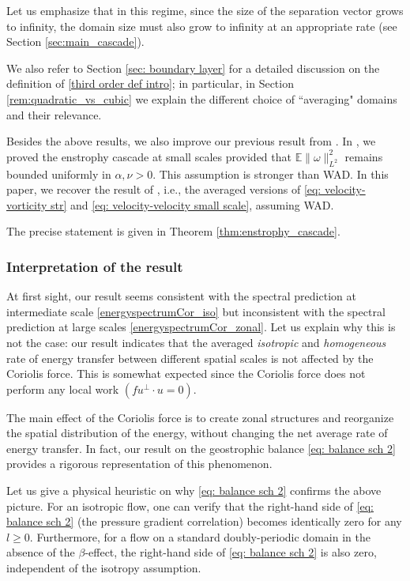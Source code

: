 \documentclass[11pt,a4paper]{article}
\numberwithin{equation}{section}
\numberwithin{theorem}{section}
\numberwithin{remark}{section}
\numberwithin{definition}{section}
\begin{document}
Let us emphasize that in this regime, since the size of the separation vector grows to infinity, the domain size must also grow to infinity at an appropriate rate (see Section \ref{sec:main_cascade}). 

We also refer to Section \ref{sec: boundary layer} for a detailed discussion on the definition of \ref{third order def intro}; in particular, in Section \ref{rem:quadratic_vs_cubic} we explain the different choice of ``averaging" domains and their relevance.

Besides the above results, we also improve our previous result from \cite{YuriAmiraliGigliola}. In \cite{YuriAmiraliGigliola}, we proved the enstrophy cascade at small scales provided that $\mathbb{E}\|\omega \|_{L^2}^2$ remains bounded uniformly in $\alpha, \nu>0$. This assumption is stronger than WAD. In this paper, we recover the result of \cite{YuriAmiraliGigliola}, i.e., the averaged versions of \eqref{eq: velocity-vorticity str} and \eqref{eq: velocity-velocity small scale}, assuming WAD.

The precise statement is given in Theorem \ref{thm:enstrophy_cascade}.



\subsubsection{Interpretation of the result}

At first sight, our result seems consistent with the spectral prediction at intermediate scale \eqref{energyspectrumCor_iso} but inconsistent with the spectral prediction at large scales \eqref{energyspectrumCor_zonal}. Let us explain why this is not the case: our result indicates that the averaged \textit{isotropic} and \textit{homogeneous} rate of energy transfer between different spatial scales is not affected by the Coriolis force. This is somewhat expected since the Coriolis force does not perform any local work $(f u^{\perp} \cdot u=0)$.  

The main effect of the Coriolis force is to create zonal structures and reorganize the spatial distribution of the energy, without changing the net average rate of energy transfer. In fact, our result on the geostrophic balance \eqref{eq: balance sch 2} provides a rigorous representation of this phenomenon. 

Let us give a physical heuristic on why \eqref{eq: balance sch 2} confirms the above picture. For an isotropic flow, one can verify that the right-hand side of \eqref{eq: balance sch 2} (the pressure gradient correlation) becomes identically zero for any $l \ge 0$. Furthermore, for a flow on a standard doubly-periodic domain in the absence of the $\beta$-effect, the right-hand side of \eqref{eq: balance sch 2} is also zero, independent of the isotropy assumption. 
\end{document}
